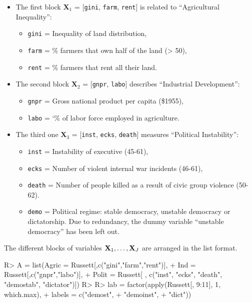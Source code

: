\documentclass[
]{jss}
\providecommand{\tightlist}{%
  \setlength{\itemsep}{0pt}\setlength{\parskip}{0pt}}
\begin{document}
\begin{itemize}
\tightlist
\item
  The first block \(\mathbf{X}_1\) = {[}\texttt{gini}, \texttt{farm},
  \texttt{rent}{]} is related to ``Agricultural Inequality'':

  \begin{itemize}
  \tightlist
  \item
    \texttt{gini} = Inequality of land distribution,
  \item
    \texttt{farm} = \% farmers that own half of the land (\textgreater{}
    50),
  \item
    \texttt{rent} = \% farmers that rent all their land.
  \end{itemize}
\item
  The second block \(\mathbf{X}_2\) = {[}\texttt{gnpr}, \texttt{labo}{]}
  describes ``Industrial Development'':

  \begin{itemize}
  \tightlist
  \item
    \texttt{gnpr} = Gross national product per capita (\$1955),
  \item
    \texttt{labo} = `\% of labor force employed in agriculture.
  \end{itemize}
\item
  The third one \(\mathbf{X}_3\) = {[}\texttt{inst}, \texttt{ecks},
  \texttt{death}{]} measures ``Political Instability'':

  \begin{itemize}
  \tightlist
  \item
    \texttt{inst} = Instability of executive (45-61),
  \item
    \texttt{ecks} = Number of violent internal war incidents (46-61),
  \item
    \texttt{death} = Number of people killed as a result of civic group
    violence (50-62).
  \item
    \texttt{demo} = Political regime: stable democracy, unstable
    democracy or dictatorship. Due to redundancy, the dummy variable
    ``unstable democracy'' has been left out.
  \end{itemize}
\end{itemize}

The different blocks of variables \(\mathbf{X}_1, \ldots, \mathbf{X}_J\) are arranged in
the list format.

\footnotesize

\begin{CodeChunk}
\begin{CodeInput}
R> A = list(Agric = Russett[,c("gini","farm","rent")], 
+          Ind = Russett[,c("gnpr","labo")], 
+          Polit = Russett[ , c("inst", "ecks",  "death", "demostab", "dictator")])
R> 
R> lab = factor(apply(Russett[, 9:11], 1, which.max),
+              labels = c("demost", 
+                         "demoinst", 
+                         "dict"))
\end{CodeInput}
\end{CodeChunk}
\end{document}
